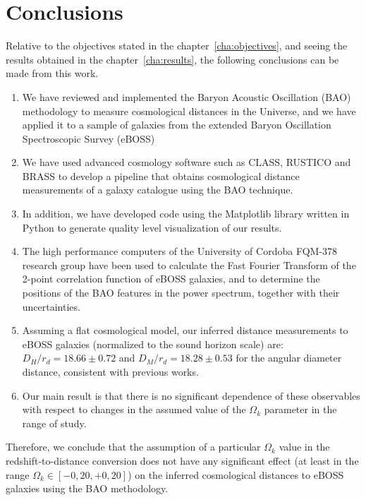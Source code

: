 \setcounter{chapter}{4}
\chapter{Conclusions}

Relative to the objectives stated in the chapter~\ref{cha:objectives}, and seeing the results obtained in the chapter~\ref{cha:results}, the following conclusions can be made from this work.

\begin{enumerate}
	\item We have reviewed and implemented the Baryon Acoustic Oscillation (BAO) methodology to measure cosmological distances in the Universe, and we have applied it to a sample of galaxies from the extended Baryon Oscillation Spectroscopic Survey (eBOSS)
	\item We have used advanced cosmology software such as CLASS, RUSTICO and BRASS to develop a pipeline that obtains cosmological distance measurements of a galaxy catalogue using the BAO technique.
	\item In addition, we have developed code using the Matplotlib library written in Python to generate quality level visualization of our results.
	\item The high performance computers of the University of Cordoba FQM-378 research group have been used to calculate the Fast Fourier Transform of the 2-point correlation function of eBOSS galaxies, and to determine the positions of the BAO features in the power spectrum, together with their uncertainties.
	\item Assuming a flat cosmological model, our inferred distance measurements to eBOSS galaxies (normalized to the sound horizon scale) are: $D_H/r_d = 18.66 \pm 0.72$ and $D_M/r_d = 18.28 \pm 0.53$ for the angular diameter distance, consistent with previous works.
	\item Our main result is that there is no significant dependence of these observables with respect to changes in the assumed value of the $\Omega_k$ parameter in the range of study.
\end{enumerate}

Therefore, we conclude that the assumption of a particular $\Omega_k$ value in the redshift-to-distance conversion does not have any significant effect (at least in the range $\Omega_k \in [-0,20, +0,20]$) on the inferred cosmological distances to eBOSS galaxies using the BAO methodology.

